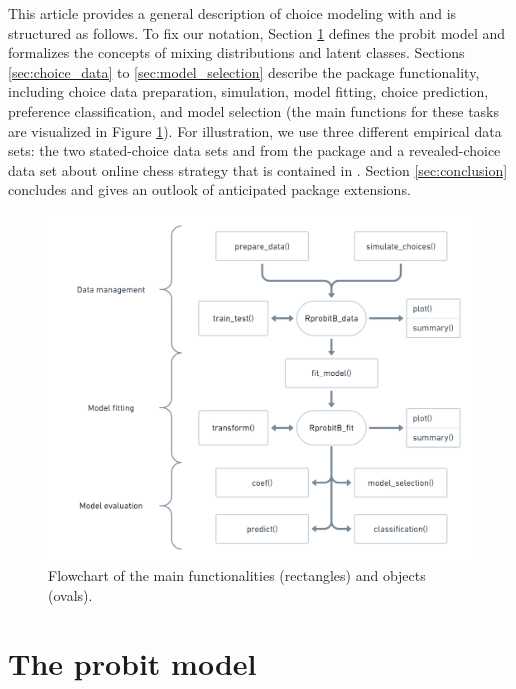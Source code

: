 \documentclass[article,shortnames]{jss}
\begin{document}
This article provides a general description of choice modeling with  and is structured as follows. To fix our notation, Section \ref{sec:probit_model} defines the probit model and formalizes the concepts of mixing distributions and latent classes. Sections \ref{sec:choice_data} to \ref{sec:model_selection} describe the package functionality, including choice data preparation, simulation, model fitting, choice prediction, preference classification, and model selection (the main functions for these tasks are visualized in Figure \ref{fig:flowchart}). For illustration, we use three different empirical data sets: the two stated-choice data sets  and  from the  package and a revealed-choice data set about online chess strategy that is contained in . Section \ref{sec:conclusion} concludes and gives an outlook of anticipated package extensions.

\begin{figure}[!ht]
  \includegraphics{flowchart.png}
  \caption{Flowchart of the main  functionalities (rectangles) and objects (ovals).}
  \label{fig:flowchart}
\end{figure}

\section{The probit model} \label{sec:probit_model}
\end{document}
